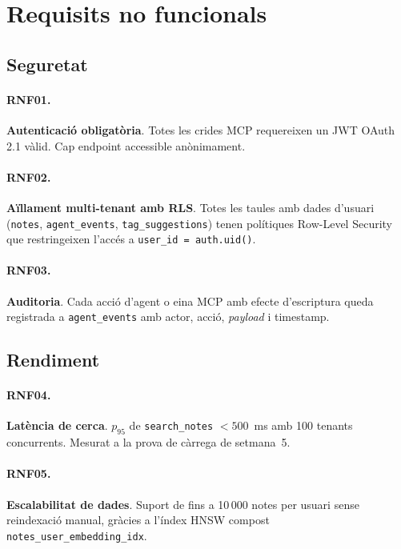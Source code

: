\section{Requisits no funcionals}
\label{sec:rnf}

\subsection{Seguretat}

\paragraph{RNF01.} \textbf{Autenticació obligatòria}. Totes les crides
MCP requereixen un JWT OAuth 2.1 vàlid. Cap endpoint accessible
anònimament.

\paragraph{RNF02.} \textbf{Aïllament multi-tenant amb RLS}. Totes les
taules amb dades d'usuari
(\texttt{notes}, \texttt{agent\_events}, \texttt{tag\_suggestions})
tenen polítiques Row-Level Security que restringeixen l'accés a
\texttt{user\_id = auth.uid()}.

\paragraph{RNF03.} \textbf{Auditoria}. Cada acció d'agent o eina MCP
amb efecte d'escriptura queda registrada a \texttt{agent\_events} amb
actor, acció, \emph{payload} i timestamp.

\subsection{Rendiment}

\paragraph{RNF04.} \textbf{Latència de cerca}. $p_{95}$ de
\texttt{search\_notes} $< 500$~ms amb 100 tenants concurrents. Mesurat a
la prova de càrrega de setmana~5.

\paragraph{RNF05.} \textbf{Escalabilitat de dades}. Suport de fins a
10\,000 notes per usuari sense reindexació manual, gràcies a l'índex
HNSW compost \texttt{notes\_user\_embedding\_idx}.

